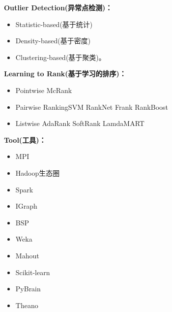 \documentclass[10pt,a4paper]{ctexbook}
\begin{document}
\textbf{Outlier Detection(异常点检测)：}
\begin{itemize}
\item Statistic-based(基于统计)
\item Density-based(基于密度)
\item Clustering-based(基于聚类)。
\end{itemize}

\textbf{Learning to Rank(基于学习的排序)：}
\begin{itemize}
\item Pointwise 
    \subitem McRank
\item Pairwise 
    \subitem RankingSVM
    \subitem RankNet
    \subitem Frank
    \subitem RankBoost
\item Listwise 
    \subitem AdaRank
    \subitem SoftRank
    \subitem LamdaMART
\end{itemize}

\textbf{Tool(工具)：}
\begin{itemize}
\item MPI
\item Hadoop生态圈
\item Spark
\item IGraph
\item BSP
\item Weka
\item Mahout
\item Scikit-learn
\item PyBrain
\item Theano 
\end{itemize}

\ifx\mlbook\undefined
    
\end{document}

